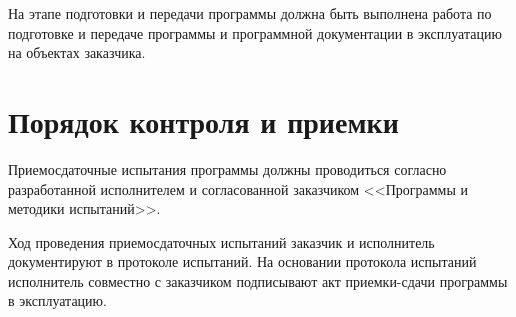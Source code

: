 \documentclass[a4page]{article}
\begin{document}
На этапе подготовки и передачи программы должна быть выполнена работа по подготовке и передаче программы и программной документации в эксплуатацию на объектах заказчика.

\section{Порядок контроля и приемки}

Приемосдаточные испытания программы должны проводиться согласно разработанной исполнителем и согласованной заказчиком <<Программы и методики испытаний>>.

Ход проведения приемосдаточных испытаний заказчик и исполнитель документируют в протоколе испытаний.
На основании протокола испытаний исполнитель совместно с заказчиком подписывают акт приемки-сдачи программы в эксплуатацию. 
\end{document}
